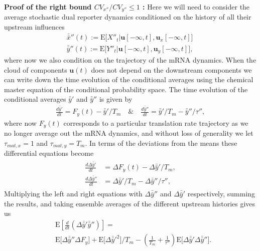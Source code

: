 \documentclass[%
 reprint,prx,
superscriptaddress,
%
%
%
%
%
%
%
%
%
 amsmath,amssymb,
 aps,
%
%
%
%
%
%
]{revtex4-2}
\begin{document}
{\noindent \textbf{Proof of the right bound $CV_{x''}/CV_{y''} \leq 1$ :} Here we will need to consider the 
average stochastic dual reporter dynamics conditioned on
the history of all their upstream influences 
\begin{align*}
&\bar{\bar{x}}''(t) := \mathrm{E} \big[ X''_{t}|\mathbf{u}[-\infty,t], \mathbf{u}_{x}[-\infty,t] \big] \quad \\
&\bar{\bar{y}}''(t) := \mathrm{E} \big[ Y''_{t}|\mathbf{u}[-\infty,t],   \mathbf{u}_{y}[-\infty,t] \big] ,
\end{align*}
where now we also condition on the trajectory of the mRNA dynamics. 
When the cloud of components $\mathbf{u}(t)$ does not depend on the downstream components we can write down the time evolution of the conditional averages using the chemical 
master equation of the conditional probability space. The time evolution of the conditional averages $\bar{\bar{y}}'$ and $\bar{\bar{y}}''$ is given by 
\begin{align*}
 \frac{d \bar{\bar{y}}'}{dt} = F_{y}(t) - \bar{\bar{y}}'/T_{m} \quad \text{\&} \quad \frac{d \bar{\bar{y}}''}{dt} = \bar{\bar{y}}'/T_{m} - \bar{\bar{y}}''/\tau'' , 
\end{align*}
where now $F_{y}(t)$ corresponds to a particular translation rate trajectory as we no longer average out the mRNA dynamics, and without loss of generality we let $\tau_{mat,x} = 1$
and $\tau_{mat,y} = T_{m}$. In terms of the deviations from the means these differential equations become
\begin{align}
\begin{split}
 \frac{d \Delta \bar{\bar{y}}'}{dt} &= \Delta F_{y}(t) - \Delta \bar{\bar{y}}'/T_{m}, \\
 \frac{d \Delta \bar{\bar{y}}''}{dt} &= \Delta \bar{\bar{y}}'/T_{m} - \Delta \bar{\bar{y}}''/\tau''  ,
 \end{split}
\label{EQ: no-feedback 3-step double bar differential equations}
\end{align}
Multiplying the left and right equations with $\Delta \bar{\bar{y}}''$ and $\Delta \bar{\bar{y}}'$ respectively, summing the results, and taking ensemble averages of the different upstream histories 
gives us
\begin{align*}
 &\mathrm{E}\left[ \frac{d}{dt}(\Delta \bar{\bar{y}}'\bar{\bar{y}}'') \right] = \\
 &\mathrm{E}\big[\Delta \bar{\bar{y}}'' \Delta F_{y} \big] + \mathrm{E}\big[\Delta \bar{\bar{y}}'^{2} \big]/T_{m} 
	      - \left(\frac{1}{T_{m}} + \frac{1}{\tau''}\right) \mathrm{E}\big[\Delta \bar{\bar{y}}' \Delta \bar{\bar{y}}''\big]  .

\end{align*}}
\end{document}
